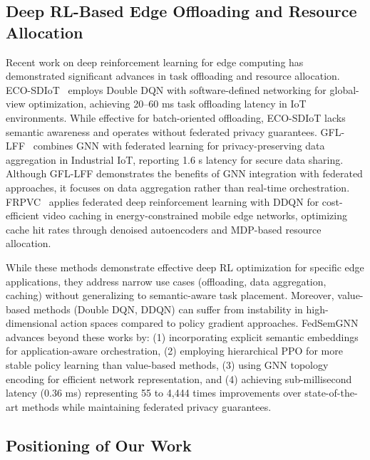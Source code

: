 \subsection{Deep RL-Based Edge Offloading and Resource Allocation}

Recent work on deep reinforcement learning for edge computing has demonstrated significant advances in task offloading and resource allocation. ECO-SDIoT~\cite{zhu2023eco} employs Double DQN with software-defined networking for global-view optimization, achieving 20--60 ms task offloading latency in IoT environments. While effective for batch-oriented offloading, ECO-SDIoT lacks semantic awareness and operates without federated privacy guarantees. GFL-LFF~\cite{regan2024gfl} combines GNN with federated learning for privacy-preserving data aggregation in Industrial IoT, reporting 1.6 s latency for secure data sharing. Although GFL-LFF demonstrates the benefits of GNN integration with federated approaches, it focuses on data aggregation rather than real-time orchestration. FRPVC~\cite{qian2025frpvc} applies federated deep reinforcement learning with DDQN for cost-efficient video caching in energy-constrained mobile edge networks, optimizing cache hit rates through denoised autoencoders and MDP-based resource allocation.

While these methods demonstrate effective deep RL optimization for specific edge applications, they address narrow use cases (offloading, data aggregation, caching) without generalizing to semantic-aware task placement. Moreover, value-based methods (Double DQN, DDQN) can suffer from instability in high-dimensional action spaces compared to policy gradient approaches. FedSemGNN advances beyond these works by: (1) incorporating explicit semantic embeddings for application-aware orchestration, (2) employing hierarchical PPO for more stable policy learning than value-based methods, (3) using GNN topology encoding for efficient network representation, and (4) achieving sub-millisecond latency (0.36 ms) representing 55 to 4,444 times improvements over state-of-the-art methods while maintaining federated privacy guarantees.

\subsection{Positioning of Our Work}

